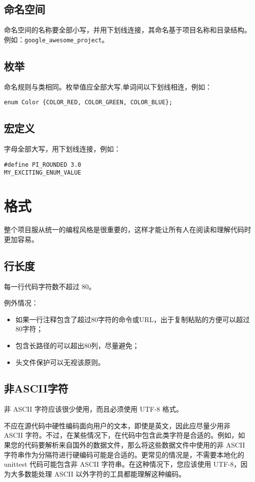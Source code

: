 \section{命名空间}
命名空间的名称要全部小写，并用下划线连接，其命名基于项目名称和目录结构。例如：\verb|google_awesome_project|。


\section{枚举}
命名规则与类相同。枚举值应全部大写,单词间以下划线相连，例如：
\begin{verbatim}
enum Color {COLOR_RED, COLOR_GREEN, COLOR_BLUE};
\end{verbatim}


\section{宏定义}
字母全部大写，用下划线连接，例如：
\begin{verbatim}
#define PI_ROUNDED 3.0
MY_EXCITING_ENUM_VALUE
\end{verbatim}


\chapter{格式}
整个项目服从统一的编程风格是很重要的，这样才能让所有人在阅读和理解代码时更加容易。


\section{行长度}
每一行代码字符数不超过 80。

例外情况：
\begin{itemize}
	\item 如果一行注释包含了超过80字符的命令或URL，出于复制粘贴的方便可以超过80字符；
	\item 包含长路径的可以超出80列，尽量避免；
	\item 头文件保护可以无视该原则。
\end{itemize}


\section{非ASCII字符}
非 ASCII 字符应该很少使用，而且必须使用 UTF-8 格式。

不应在源代码中硬性编码面向用户的文本，即使是英文，因此应尽量少用非 ASCII 字符。不过，在某些情况下，在代码中包含此类字符是合适的。例如，如果您的代码要解析来自国外的数据文件，那么将这些数据文件中使用的非 ASCII 字符串作为分隔符进行硬编码可能是合适的。更常见的情况是，不需要本地化的 unittest 代码可能包含非 ASCII 字符串。在这种情况下，您应该使用 UTF-8，因为大多数能处理 ASCII 以外字符的工具都能理解这种编码。

